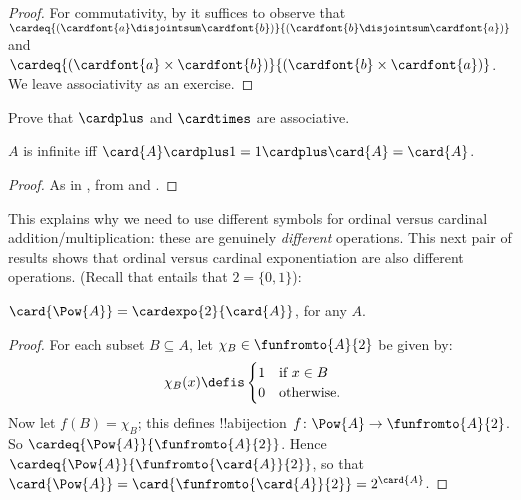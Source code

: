 \documentclass[../../../include/open-logic-section]{subfiles}
\begin{document}
\begin{proof}
For commutativity, by
 it
suffices to observe that $\cardeq{(\cardfont{a} \disjointsum
\cardfont{b})}{(\cardfont{b} \disjointsum \cardfont{a})}$ and
$\cardeq{(\cardfont{a} \times \cardfont{b})}{(\cardfont{b} \times
\cardfont{a})}$. We leave associativity as an exercise.
\end{proof}

\begin{prob}
Prove that $\cardplus$ and $\cardtimes$ are associative.
\end{prob}

\begin{prop}
$A$ is infinite iff $\card{A} \cardplus 1 = 1 \cardplus \card{A} = \card{A}$.
\end{prop}

\begin{proof}
As in
, from
 and
. 
\end{proof}

This explains why we need to use different symbols for ordinal versus
cardinal addition/multiplication: these are genuinely \emph{different}
operations. This next pair of results shows that ordinal versus
cardinal exponentiation are also different operations. (Recall that
 entails that $2 = \{0,
1\}$):

\begin{lem}
$\card{\Pow{A}} = \cardexpo{2}{\card{A}}$, for any $A$.
\end{lem}

\begin{proof}
For each subset $B \subseteq A$, let $\chi_B \in \funfromto{A}{2}$ be given by:
\begin{align*}
	\chi_{B}(x) &\defis
	\begin{cases}
		1 & \text{if }x\in B\\
		0 & \text{otherwise.}
	\end{cases}
\end{align*}
Now let $f(B) = \chi_B$; this defines !!a{bijection} $f \colon \Pow{A}
\to \funfromto{A}{2}$. So $\cardeq{\Pow{A}}{\funfromto{A}{2}}$. Hence
$\cardeq{\Pow{A}}{\funfromto{\card{A}}{2}}$, so that
$\card{\Pow{A}} = \card{\funfromto{\card{A}}{2}} =
2^{\card{A}}$.
\end{proof}
\end{document}
